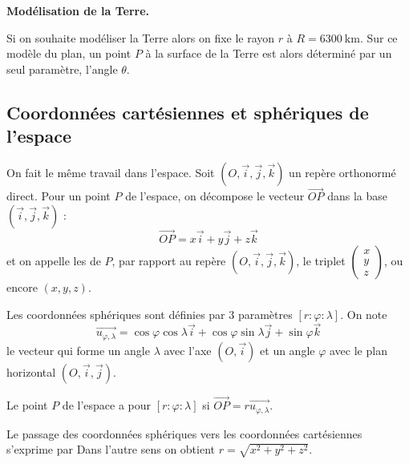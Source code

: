 \documentclass[class=report,crop=false]{standalone}
\newcommand{\vect}{\overrightarrow}
\begin{document}
\bigskip

\textbf{Modélisation de la Terre.}

Si on souhaite modéliser la Terre alors on fixe le rayon $r$ à $R
= \SI{6300}{\kilo\meter}$. Sur ce modèle du plan, 
un point $P$ à la surface de la Terre est alors
déterminé par un seul paramètre, l'angle $\theta$.




\subsection{Coordonnées cartésiennes et sphériques de l'espace}
\label{ssec:coord}

On fait le même travail dans l'espace. Soit $(O,\vect{i},\vect{j},\vect{k})$ un repère orthonormé direct.
Pour un point $P$ de l'espace, on décompose le vecteur $\vect{OP}$
dans la base $(\vect{i},\vect{j},\vect{k})$ :
$$\vect{OP} = x \vect{i}+y\vect{j}+z\vect{k}$$
et on appelle les  de $P$, par rapport au
repère $(O,\vect{i},\vect{j},\vect{k})$, le triplet 
$\left(\begin{smallmatrix}x\\y\\z\end{smallmatrix}\right)$, ou encore $(x,y,z)$.






Les coordonnées sphériques sont définies par $3$ paramètres 
$[r :\varphi :\lambda]$.
On note 
$$\vect{u_{\varphi,\lambda}}= \cos \varphi \cos \lambda \vect{i} + \cos \varphi \sin \lambda\vect{j} + \sin \varphi\vect{k}$$
le vecteur qui forme un angle $\lambda$ avec l'axe $(O,\vect{i})$ et
un angle $\varphi$ avec le plan horizontal $(O,\vect{i},\vect{j})$.




Le point $P$ de l'espace a pour  $[r :\varphi :\lambda]$ 
si $\vect{OP}=r\vect{u_{\varphi,\lambda}}$.

\bigskip

Le passage des coordonnées sphériques vers les coordonnées cartésiennes s'exprime par
Dans l'autre sens on obtient $r = \sqrt{x^2+y^2+z^2}$.
\end{document}

